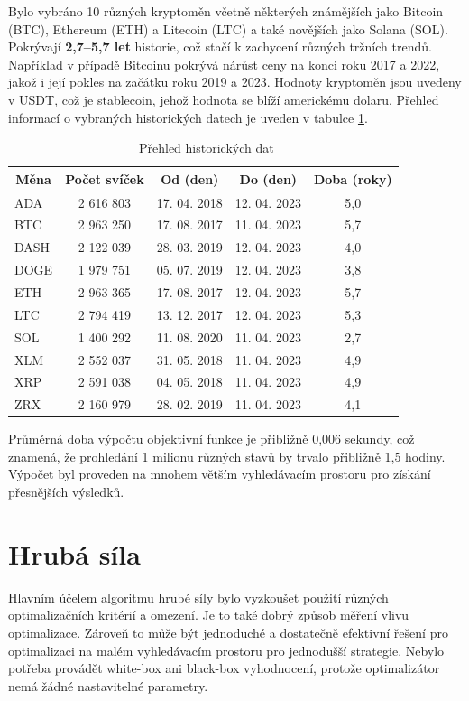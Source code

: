 Bylo vybráno 10 různých kryptoměn včetně některých známějších jako Bitcoin (BTC), Ethereum (ETH) a Litecoin (LTC) a také novějších jako Solana (SOL).
Pokrývají \textbf{2,7--5,7 let} historie, což stačí k zachycení různých tržních trendů.
Například v případě Bitcoinu pokrývá nárůst ceny na konci roku 2017 a 2022, jakož i její pokles na začátku roku 2019 a 2023.
Hodnoty kryptoměn jsou uvedeny v USDT, což je stablecoin, jehož hodnota se blíží americkému dolaru.
Přehled informací o vybraných historických datech je uveden v tabulce \ref{tab:historical:market:data}.

\begin{table}[!htbp]
\centering
\centering
\caption[Přehled vybraných historických dat]{~Přehled historických dat}\label{tab:historical:market:data}
{%
\begin{tabular}{|l|c|c|c|c|}
\hline
\multicolumn{1}{|c|}{\textbf{Měna}} & \textbf{Počet svíček} & \textbf{Od (den)} & \textbf{Do (den)} & \textbf{Doba (roky)} \\ \hline
ADA  & 2 616 803 & 17. 04. 2018 & 12. 04. 2023 & 5,0 \\ \hline
BTC  & 2 963 250 & 17. 08. 2017 & 11. 04. 2023 & 5,7 \\ \hline
DASH & 2 122 039 & 28. 03. 2019 & 12. 04. 2023 & 4,0 \\ \hline
DOGE & 1 979 751 & 05. 07. 2019 & 12. 04. 2023 & 3,8 \\ \hline
ETH  & 2 963 365 & 17. 08. 2017 & 12. 04. 2023 & 5,7 \\ \hline
LTC  & 2 794 419 & 13. 12. 2017 & 12. 04. 2023 & 5,3 \\ \hline
SOL  & 1 400 292 & 11. 08. 2020 & 11. 04. 2023 & 2,7 \\ \hline
XLM  & 2 552 037 & 31. 05. 2018 & 11. 04. 2023 & 4,9 \\ \hline
XRP  & 2 591 038 & 04. 05. 2018 & 11. 04. 2023 & 4,9 \\ \hline
ZRX  & 2 160 979 & 28. 02. 2019 & 11. 04. 2023 & 4,1 \\ \hline
\end{tabular}%
}
\end{table}

Průměrná doba výpočtu objektivní funkce je přibližně 0,006 sekundy, což znamená, že prohledání 1 milionu různých stavů by trvalo přibližně 1,5 hodiny.
Výpočet byl proveden na mnohem větším vyhledávacím prostoru pro získání přesnějších výsledků.

\section{Hrubá síla}
Hlavním účelem algoritmu hrubé síly bylo vyzkoušet použití různých optimalizačních kritérií a omezení.
Je to také dobrý způsob měření vlivu optimalizace.
Zároveň to může být jednoduché a dostatečně efektivní řešení pro optimalizaci na malém vyhledávacím prostoru pro jednodušší strategie.
Nebylo potřeba provádět white-box ani black-box vyhodnocení, protože optimalizátor nemá žádné nastavitelné parametry.

